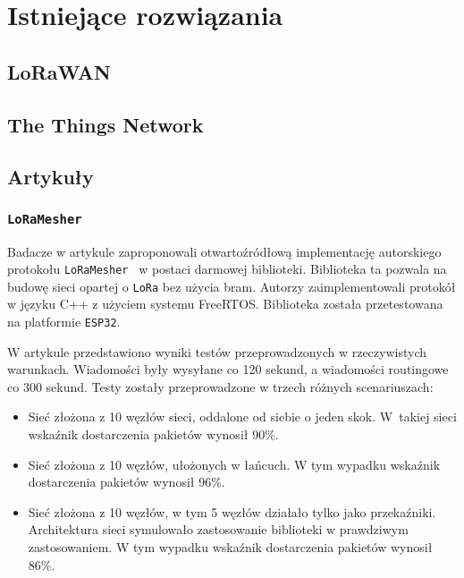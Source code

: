\chapter{Istniejące rozwiązania}

\section{LoRaWAN}
\section{The Things Network}



\section{Artykuły}
\subsection{\texttt{LoRaMesher}}
Badacze w artykule zaproponowali otwartoźródłową implementację autorskiego protokołu \texttt{LoRaMesher}~\cite{bib:loramesher} w postaci darmowej biblioteki. Biblioteka ta pozwala na budowę sieci opartej o \texttt{LoRa} bez użycia bram. Autorzy zaimplementowali protokół w języku C++ z użyciem systemu FreeRTOS. Biblioteka została przetestowana na platformie \texttt{ESP32}.

W artykule przedstawiono wyniki testów przeprowadzonych w rzeczywistych warunkach. Wiadomości były wysyłane co 120 sekund, a wiadomości routingowe co 300 sekund. Testy zostały przeprowadzone w trzech różnych scenariuszach:

\begin{itemize}
    \item Sieć złożona z 10 węzłów sieci, oddalone od siebie o jeden skok. W~takiej sieci wskaźnik dostarczenia pakietów wynosił 90\%.
    \item Sieć złożona z 10 węzłów, ułożonych w łańcuch. W tym wypadku wskaźnik dostarczenia pakietów wynosił 96\%.
    \item Sieć złożona z 10 węzłów, w tym 5 węzłów działało tylko jako przekaźniki. Architektura sieci symulowało zastosowanie biblioteki w prawdziwym zastosowaniem. W tym wypadku wskaźnik dostarczenia pakietów wynosił 86\%.
\end{itemize}

